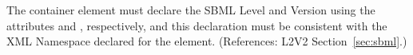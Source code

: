 The  container element must declare the SBML Level and
Version using the attributes  and ,
respectively, and this declaration must be consistent with the
XML Namespace declared for the  element.  (References: 
L2V2 Section~\ref{sec:sbml}.)

